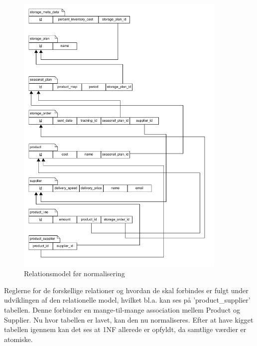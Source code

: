 \begin{figure}[H]
    \centering
    \includegraphics[width=0.9\textwidth]{figures/krav/relation_model_0th_normalization.png}
    \caption{Relationsmodel før normalisering}
    \label{fig:relational_model_0}
\end{figure}

Reglerne for de forskellige relationer og hvordan de skal forbindes er fulgt under udviklingen af den relationelle model, hvilket bl.a. kan ses på 'product_supplier' tabellen. Denne forbinder en mange-til-mange association mellem Product og Supplier. 
Nu hvor tabellen er lavet, kan den nu normaliseres.
Efter at have kigget tabellen igennem kan det ses at 1NF allerede er opfyldt, da samtlige værdier er atomiske.




